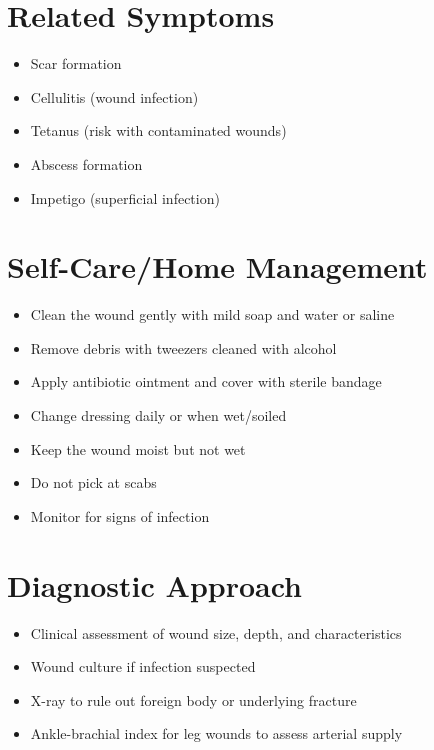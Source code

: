 \section{Related Symptoms}
\begin{itemize}
\item Scar formation
\item Cellulitis (wound infection)
\item Tetanus (risk with contaminated wounds)
\item Abscess formation
\item Impetigo (superficial infection)
\end{itemize}

\section{Self-Care/Home Management}
\begin{itemize}
\item Clean the wound gently with mild soap and water or saline
\item Remove debris with tweezers cleaned with alcohol
\item Apply antibiotic ointment and cover with sterile bandage
\item Change dressing daily or when wet/soiled
\item Keep the wound moist but not wet
\item Do not pick at scabs
\item Monitor for signs of infection
\end{itemize}

\section{Diagnostic Approach}
\begin{itemize}
\item Clinical assessment of wound size, depth, and characteristics
\item Wound culture if infection suspected
\item X-ray to rule out foreign body or underlying fracture
\item Ankle-brachial index for leg wounds to assess arterial supply
\end{itemize}

